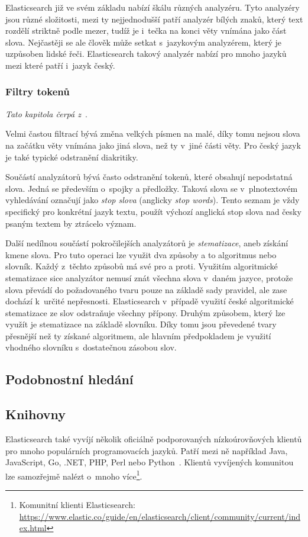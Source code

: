 Elasticsearch již ve svém základu nabízí škálu různých analyzéru. Tyto analyzéry jsou různé složitosti, mezi ty nejjednodušší patří analyzér bílých znaků, který text rozdělí striktně podle mezer, tudíž je i~tečka na konci věty vnímána jako část slova. Nejčastěji se ale člověk může setkat s~jazykovým analyzérem, který je uzpůsoben lidské řeči. Elasticsearch takový analyzér nabízí pro mnoho jazyků mezi které patří i~jazyk český.

\subsubsection*{Filtry tokenů}
\emph{Tato kapitola čerpá z~\cite{bib:elastic-fulltext}}.

Velmi častou filtrací bývá změna velkých písmen na malé, díky tomu nejsou slova na začátku věty vnímána jako jiná slova, než ty v~jiné části věty. Pro český jazyk je také typické odstranění diakritiky.

Součástí analyzátorů bývá často odstranění tokenů, které obsahují nepodstatná slova. Jedná se především o~spojky a předložky. Taková slova se v~plnotextovém vyhledávání označují jako \emph{stop slova} (anglicky \emph{stop words}). Tento seznam je vždy specifický pro konkrétní jazyk textu, použít výchozí anglická stop slova nad česky psaným textem by ztrácelo význam.

Další nedílnou součástí pokročilejších analyzátorů je \emph{stematizace}, aneb získání kmene slova. Pro tuto operaci lze využit dva způsoby a to algoritmus nebo slovník. Každý z~těchto způsobů má své pro a proti.
Využitím algoritmické stematizace sice analyzátor nemusí znát všechna slova v~daném jazyce, protože slova převádí do požadovaného tvaru pouze na základě sady pravidel, ale zase dochází k~určité nepřesnosti. Elasticsearch v~případě využití české algoritmické stematizace ze slov odstraňuje všechny přípony.
Druhým způsobem, který lze využít je stematizace na základě slovníku. Díky tomu jsou převedené tvary přesnější než ty získané algoritmem, ale hlavním předpokladem je využití vhodného slovníku s~dostatečnou zásobou slov.

\subsection{Podobnostní hledání}
\blindtext[2]

\subsection{Knihovny}
Elasticsearch také vyvíjí několik oficiálně podporovaných nízkoúrovňových klientů pro mnoho populárních programovacích jazyků. Patří mezi ně například Java, JavaScript, Go, .NET, PHP, Perl nebo Python~\cite{bib:elastic-clients}.
Klientů vyvíjených komunitou lze samozřejmě nalézt o~mnoho více\footnote{Komunitní klienti Elasticsearch: \url{https://www.elastic.co/guide/en/elasticsearch/client/community/current/index.html}}.


